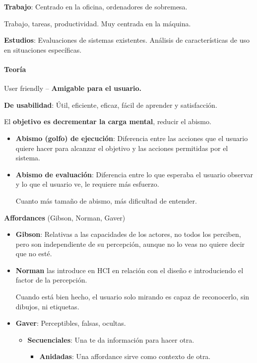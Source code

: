 \documentclass[12pt]{report} %
\begin{document}
\textbf{Trabajo}: Centrado en la oficina, ordenadores de sobremesa.

Trabajo, tareas, productividad. Muy centrada en la máquina.

\textbf{Estudios}: Evaluaciones de sistemas existentes. Análisis de
características de uso en situaciones específicas.

\hypertarget{teoruxeda}{%
\paragraph{Teoría}\label{teoruxeda}}

User friendly -- \textbf{Amigable para el usuario.}

\textbf{De usabilidad}: Útil, eficiente, eficaz, fácil de aprender y
satisfacción.

El \textbf{objetivo es decrementar la carga mental}, reducir el abismo.

\begin{itemize}
\item
  \textbf{Abismo (golfo) de ejecución}: Diferencia entre las acciones
  que el usuario quiere hacer para alcanzar el objetivo y las acciones
  permitidas por el sistema.
\item
  \textbf{Abismo de evaluación}: Diferencia entre lo que esperaba el
  usuario observar y lo que el usuario ve, le requiere más esfuerzo.

  Cuanto más tamaño de abismo, más dificultad de entender.
\end{itemize}

\textbf{Affordances} (Gibson, Norman, Gaver)

\begin{itemize}
\item
  \textbf{Gibson}: Relativas a las capacidades de los actores, no todos
  los perciben, pero son independiente de su percepción, aunque no lo
  veas no quiere decir que no esté.
\item
  \textbf{Norman} las introduce en HCI en relación con el diseño e
  introduciendo el factor de la percepción.

  Cuando está bien hecho, el usuario solo mirando es capaz de
  reconocerlo, sin dibujos, ni etiquetas.
\item
  \textbf{Gaver}: Perceptibles, falsas, ocultas.

  \begin{itemize}
  
  \item
    \textbf{Secuenciales}: Una te da información para hacer otra.

    \begin{itemize}
    
    \item
      \textbf{Anidadas}: Una affordance sirve como contexto de otra.
    \end{itemize}
  \end{itemize}
\end{itemize}
\end{document}
